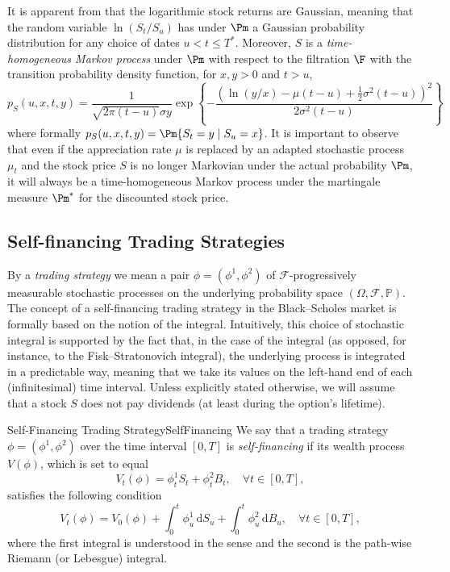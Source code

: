 It is apparent from  that the logarithmic stock returns are Gaussian, meaning that the random variable $\ln(S_t/S_u)$ has under $\Pm$ a Gaussian probability distribution for any choice of dates $u < t \le T^*$. Moreover, $S$ is a \emph{time-homogeneous Markov process} under $\Pm$ with respect to the filtration $\F$ with the transition probability density function, for $x, y > 0$ and $t > u$,
\begin{equation} \label{eq:GBMTransitionDensity}
	p_S(u, x, t, y) = \frac{1}{\sqrt{2\pi (t-u)} \sigma y} \exp \left\{ - \frac{\left( \ln(y/x) - \mu(t-u) + \frac{1}{2}\sigma^2(t-u) \right)^2}{2\sigma^2(t-u)} \right\}
\end{equation}
where formally $p_S(u, x, t, y) = \Pm \{S_t = y \mid S_u = x\}$. It is important to observe that even if the appreciation rate $\mu$ is replaced by an adapted stochastic process $\mu_t$ and the stock price $S$ is no longer Markovian under the actual probability $\Pm$, it will always be a time-homogeneous Markov process under the martingale measure $\Pm^*$ for the discounted stock price.

\subsection{Self-financing Trading Strategies}
By a \textit{trading strategy} we mean a pair $\phi = (\phi^1, \phi^2)$ of $\mathcal{F}$-progressively measurable stochastic processes on the underlying probability space $(\Omega, \mathcal{F}, \mathbb{P})$. The concept of a self-financing trading strategy in the Black–Scholes market is formally based on the notion of the \Ito \; integral. Intuitively, this choice of stochastic integral is supported by the fact that, in the case of the \Ito \; integral (as opposed, for instance, to the Fisk–Stratonovich integral), the underlying process is integrated in a predictable way, meaning that we take its values on the left-hand end of each (infinitesimal) time interval. Unless explicitly stated otherwise, we will assume that a stock $S$ does not pay dividends (at least during the option's lifetime).

\begin{defn}{Self-Financing Trading Strategy}{SelfFinancing}
	We say that a trading strategy $\phi = (\phi^1, \phi^2)$ over the time interval $[0, T]$ is \textit{self-financing} if its wealth process $V(\phi)$, which is set to equal
	\begin{equation}
		V_t(\phi) = \phi^1_t S_t + \phi^2_t B_t, \quad \forall t \in [0, T],
		\label{eq:WealthProcess}
	\end{equation}
	satisfies the following condition
	\begin{equation}
		V_t(\phi) = V_0(\phi) + \int_0^t \phi^1_u \, \mathrm{d} S_u + \int_0^t \phi^2_u \, \mathrm{d} B_u, \quad \forall t \in [0, T],
		\label{eq:SelfFinancingCondition}
	\end{equation}
	where the first integral is understood in the \Ito \; sense and the second is the path-wise Riemann (or Lebesgue) integral.
\end{defn}


